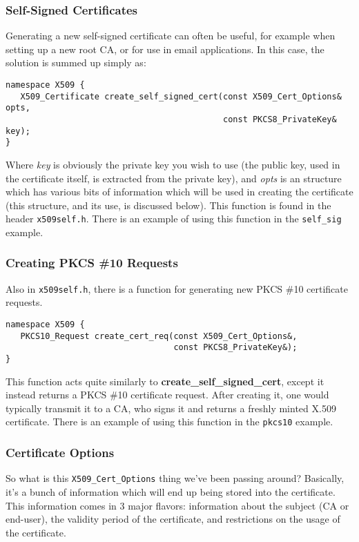 \documentclass{article}
\newcommand{\filename}[1]{\texttt{#1}}
\newcommand{\function}[1]{\textbf{#1}}
\newcommand{\type}[1]{\texttt{#1}}
\renewcommand{\arg}[1]{\textsl{#1}}
\begin{document}
\subsubsection{Self-Signed Certificates}

Generating a new self-signed certificate can often be useful, for example when
setting up a new root CA, or for use in email applications. In this case,
the solution is summed up simply as:

\begin{verbatim}
namespace X509 {
   X509_Certificate create_self_signed_cert(const X509_Cert_Options& opts,
                                            const PKCS8_PrivateKey& key);
}
\end{verbatim}

Where \arg{key} is obviously the private key you wish to use (the public key,
used in the certificate itself, is extracted from the private key), and
\arg{opts} is an structure which has various bits of information which will be
used in creating the certificate (this structure, and its use, is discussed
below). This function is found in the header \filename{x509self.h}. There is an
example of using this function in the \filename{self\_sig} example.

\subsubsection{Creating PKCS \#10 Requests}

Also in \filename{x509self.h}, there is a function for generating new PKCS \#10
certificate requests.

\begin{verbatim}
namespace X509 {
   PKCS10_Request create_cert_req(const X509_Cert_Options&,
                                  const PKCS8_PrivateKey&);
}
\end{verbatim}

This function acts quite similarly to \function{create\_self\_signed\_cert},
except it instead returns a PKCS \#10 certificate request. After creating it,
one would typically transmit it to a CA, who signs it and returns a freshly
minted X.509 certificate. There is an example of using this function in the
\filename{pkcs10} example.

\subsubsection{Certificate Options}

So what is this \type{X509\_Cert\_Options} thing we've been passing around?
Basically, it's a bunch of information which will end up being stored into the
certificate. This information comes in 3 major flavors: information about the
subject (CA or end-user), the validity period of the certificate, and
restrictions on the usage of the certificate.
\end{document}
